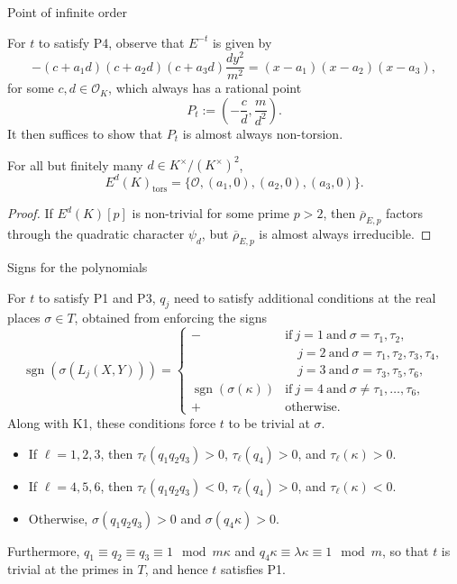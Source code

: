 \documentclass[10pt]{beamer}
\begin{document}
\begin{frame}[t]{Point of infinite order}

For $ t $ to satisfy P4, observe that $ E^{-t} $ is given by
$$ -(c + a_1d)(c + a_2d)(c + a_3d)\dfrac{dy^2}{m^2} = (x - a_1)(x - a_2)(x - a_3), $$
for some $ c, d \in \mathcal{O}_K $, which always has a rational point
$$ P_t := \left(-\dfrac{c}{d}, \dfrac{m}{d^2}\right). $$
It then suffices to show that $ P_t $ is almost always non-torsion.

\begin{lemma}[3.2]
For all but finitely many $ d \in K^\times / (K^\times)^2 $,
$$ E^d(K)_{\text{tors}} = \{\mathcal{O}, (a_1, 0), (a_2, 0), (a_3, 0)\}. $$
\end{lemma}

\vspace{-0.5cm}

\begin{proof}
If $ E^d(K)[p] $ is non-trivial for some prime $ p > 2 $, then $ \overline{\rho}_{E, p} $ factors through the quadratic character $ \psi_d $, but $ \overline{\rho}_{E, p} $ is almost always irreducible.
\end{proof}

\end{frame}

\begin{frame}[t]{Signs for the polynomials}

For $ t $ to satisfy P1 and P3, $ q_j $ need to satisfy additional conditions at the real places $ \sigma \in T $, obtained from enforcing the signs
$$ \operatorname{sgn}(\sigma(L_j(X, Y))) =
\begin{cases}
- & \text{if} \ j = 1 \ \text{and} \ \sigma = \tau_1, \tau_2, \\
& \quad \! j = 2 \ \text{and} \ \sigma = \tau_1, \tau_2, \tau_3, \tau_4, \\
& \quad \! j = 3 \ \text{and} \ \sigma = \tau_3, \tau_5, \tau_6, \\
\operatorname{sgn}(\sigma(\kappa)) & \text{if} \ j = 4 \ \text{and} \ \sigma \ne \tau_1, \dots, \tau_6, \\
+ & \text{otherwise}.
\end{cases}
$$
Along with K1, these conditions force $ t $ to be trivial at $ \sigma $.
\begin{itemize}
\item If $ \ell = 1, 2, 3 $, then $ \tau_\ell(q_1q_2q_3) > 0 $, $ \tau_\ell(q_4) > 0 $, and $ \tau_\ell(\kappa) > 0 $.
\item If $ \ell = 4, 5, 6 $, then $ \tau_\ell(q_1q_2q_3) < 0 $, $ \tau_\ell(q_4) > 0 $, and $ \tau_\ell(\kappa) < 0 $.
\item Otherwise, $ \sigma(q_1q_2q_3) > 0 $ and $ \sigma(q_4\kappa) > 0 $.
\end{itemize}
Furthermore, $ q_1 \equiv q_2 \equiv q_3 \equiv 1 \mod m\kappa $ and $ q_4\kappa \equiv \lambda\kappa \equiv 1 \mod m $, so that $ t $ is trivial at the primes in $ T $, and hence $ t $ satisfies P1.

\end{frame}
\end{document}
